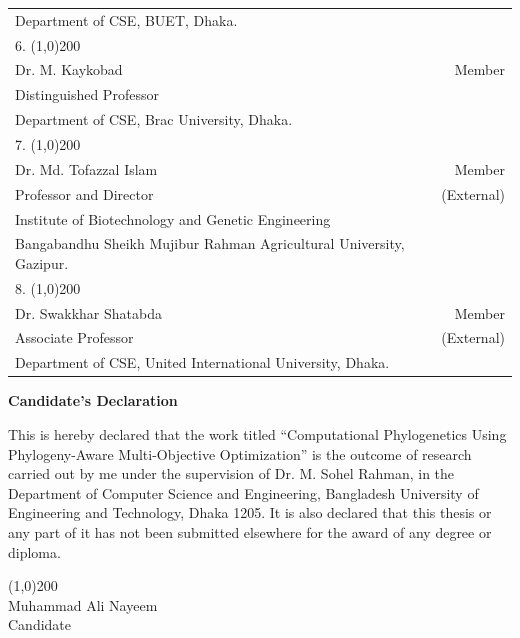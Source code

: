 \begin{singlespace}
{\begin{spacing}{0.5}
\begin{tabular}{p{12cm} r }
	Department of CSE, BUET, Dhaka.  & \\
 	\vspace{0.1cm}
 	6. \line(1,0){200} &  \\
 	Dr. M. Kaykobad  & Member\\ 
 	Distinguished Professor & \\
 	Department of CSE, Brac University, Dhaka.  & \\
 	\vspace{0.1cm}
 	7. \line(1,0){200} &  \\
 	Dr. Md. Tofazzal Islam & Member\\ 
 	Professor and Director  & (External)\\
 	Institute of Biotechnology and Genetic Engineering & \\ 
 	Bangabandhu Sheikh Mujibur Rahman Agricultural University, Gazipur. & \\
 	\vspace{0.1cm}
 	8. \line(1,0){200} &  \\
 	Dr. Swakkhar Shatabda & Member\\ 
 	Associate Professor  & (External)\\
 	Department of CSE, United International University, Dhaka. & \\
 \end{tabular}
 \end{spacing}
}
\end{singlespace}
 \newpage
 \begin{center}
 \LARGE \textbf{Candidate's Declaration}
 \end{center}
 \vspace{3cm}
 This is hereby declared that the work titled ``Computational Phylogenetics Using Phylogeny-Aware Multi-Objective Optimization'' is the outcome of research carried out by me under the supervision of Dr. M. Sohel Rahman, in the Department of Computer Science and Engineering,
 Bangladesh University of Engineering and Technology, Dhaka 1205. 
 It is also declared that this thesis or any part of it has not been submitted elsewhere for the award of any degree or diploma. \\
 \vspace{4cm}
\begin{center}
 \line(1,0){200}\\
 \large
 Muhammad Ali Nayeem \\
 Candidate
\end{center}
 

 
 
 